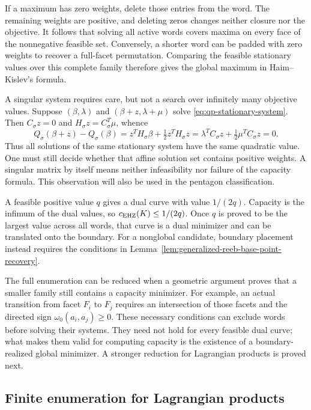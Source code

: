If a maximum has zero weights, delete those entries from the word. The
remaining weights are positive, and deleting zeros changes neither closure
nor the objective. It follows that solving all active words covers maxima
on every face of the nonnegative feasible set. Conversely, a shorter word
can be padded with zero weights to recover a full-facet permutation.
Comparing the feasible stationary values over this complete family
therefore gives the global maximum in Haim--Kislev's formula.

A singular system requires care, but not a search over infinitely many
objective values. Suppose $(\beta,\lambda)$ and
$(\beta+z,\lambda+\mu)$ solve \eqref{eq:qp-stationary-system}. Then
$C_\sigma z=0$ and $H_\sigma z=C_\sigma^T\mu$, whence
\[
 Q_\sigma(\beta+z)-Q_\sigma(\beta)
 =z^TH_\sigma\beta+\tfrac12z^TH_\sigma z
 =\lambda^TC_\sigma z+\tfrac12\mu^TC_\sigma z=0.
\]
Thus all solutions of the same stationary system have the same quadratic
value. One must still decide whether that affine solution set contains
positive weights. A singular matrix by itself means neither infeasibility
nor failure of the capacity formula. This observation will also be used
in the pentagon classification.

A feasible positive value $q$ gives a dual curve with value $1/(2q)$.
Capacity is the infimum of the dual values, so
$c_{\rm EHZ}(K)\leq1/(2q)$. Once $q$ is proved to
be the largest value across all words, that curve is a dual minimizer and
can be translated onto the boundary. For a nonglobal candidate, boundary
placement instead requires the conditions in
Lemma~\ref{lem:generalized-reeb-base-point-recovery}.

The full enumeration can be reduced when a geometric argument proves that
a smaller family still contains a capacity minimizer. For example, an
actual transition from facet $F_i$ to $F_j$ requires an intersection of
those facets and the directed sign $\omega_0(a_i,a_j)\geq0$. These
necessary conditions can exclude words before solving their systems.
They need not hold for every feasible dual curve; what makes them valid
for computing capacity is the existence of a boundary-realized global
minimizer. A stronger reduction for Lagrangian products is proved next.

\subsection{Finite enumeration for Lagrangian products}
\label{subsec:quadratic-program-algorithm-hk2019-lagrangian-products}

